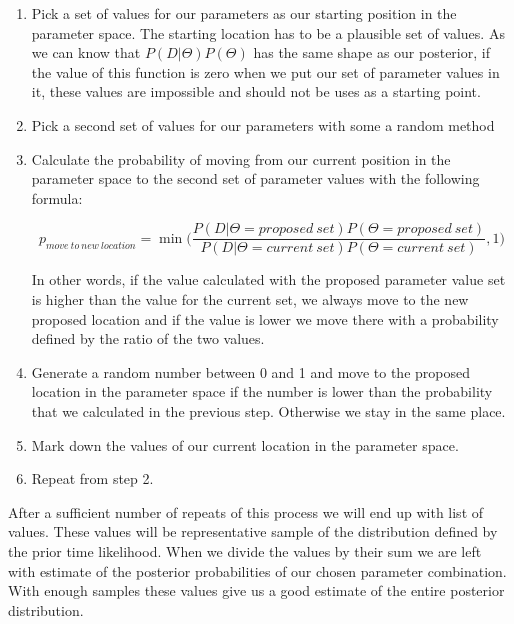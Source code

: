 \documentclass[12pt,a4paper,leqno]{report}
\theoremstyle{plain}
\theoremstyle{definition}
\theoremstyle{remark}
\begin{document}
\begin{enumerate}
    \item Pick a set of values for our parameters as our starting position in
          the parameter space. The starting location has to be a plausible set
          of values. As we can know that
          \(P(D|\Theta)P(\Theta)\) has the same shape as our posterior, if
          the value of this function is zero when we put our set of
          parameter values in it, these values are impossible and should not be
          uses as a starting point.
    \item Pick a second set of values for our parameters with some a random method
    \item Calculate the probability of moving from our current position in the
          parameter space to the second set of parameter values with the
          following formula:

          \begin{def}\label{randomwalk}
              \begin{equation}
                  p_{move\ to\ new\ location} = \min \bigg(\frac{P(D|\Theta = proposed\ set)P(\Theta = proposed\ set)}{P(D|\Theta = current\ set)P(\Theta = current\ set)}, 1 \bigg)
              \end{equation}
          \end{def}
          In other words, if the value calculated with the proposed parameter
          value set is higher than the value for the current set, we always move
          to the new proposed location and if the value
          is lower we move there with a probability defined by the ratio of the
          two values.
    \item Generate a random number between 0 and 1 and move to the proposed
          location in the parameter space if the number is lower than the
          probability that we calculated in the previous step. Otherwise we stay
          in the same place.
    \item Mark down the values of our current location in the parameter space.
    \item Repeat from step 2.

\end{enumerate}

After a sufficient number of repeats of this process we will end up with list of values.
These values will be representative sample of the distribution defined by the prior time
likelihood. When we divide the values by their sum we are left with estimate of the
posterior probabilities of our chosen parameter combination. With enough samples these
values give us a good estimate of the entire posterior distribution.
\end{document}
